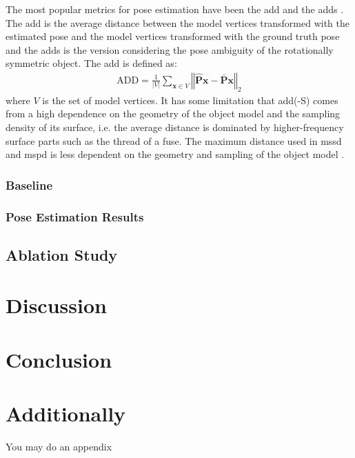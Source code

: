 \documentclass[12pt,DIV14,BCOR12mm,a4paper,footinclude=false,headinclude,parskip=half-,twoside,openright,cleardoublepage=empty,toc=index,bibliography=totoc,listof=totoc]{scrreprt}
\numberwithin{equation}{chapter}
\begin{document}
The most popular metrics for pose estimation have been the \gls{add} and the \gls{adds} \cite{hinterstoisser2012model}. The \gls{add} is the average distance between the model vertices transformed with the estimated pose and the model vertices transformed with the ground truth pose and the \gls{adds} is the version considering the pose ambiguity of the rotationally symmetric object. The \gls{add} is defined as:
\begin{align}
  \text{ADD}=\frac{1}{\left|V\right|}\sum_{\mathbf{x}\in V}\left\Vert \hat{\mathbf{P}}\mathbf{x}-\bar{\mathbf{P}}\mathbf{x}\right\Vert _{2}
\end{align}
where $V$ is the set of model vertices. It has some limitation that \gls{add}(-S) comes from a high dependence on the geometry of the object model and the sampling density of its surface, i.e. the average distance is dominated by higher-frequency surface parts such as the thread of a fuse. The maximum distance used in \gls{mssd} and \gls{mspd} is less dependent on the geometry and sampling of the object model \cite{hodan2020bop}.

\subsection{Baseline}

\subsection{Pose Estimation Results}

\section{Ablation Study}

\chapter{Discussion}

\chapter{Conclusion}

\appendix
\chapter{Additionally}
You may do an appendix



\listoffigures
\listoftables
\end{document}
